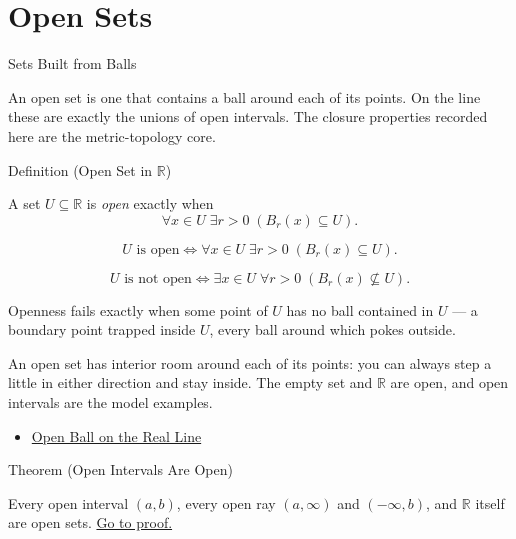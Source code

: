 \section{Open Sets}
\label{sec:open-sets}

\begin{topicbox}{Sets Built from Balls}
\begin{exposition}
An open set is one that contains a ball around each of its points. On the line these are exactly the unions of open intervals. The closure properties recorded here are the metric-topology core.
\end{exposition}
\end{topicbox}
\begin{definitionbox}{Definition (Open Set in $\mathbb{R}$)}
\begin{definition}
\label{def:open-set}
A set $U\subseteq\mathbb{R}$ is \emph{open} exactly when
\[
\forall x\in U\;\exists r>0\;(B_{r}(x)\subseteq U).
\]
\end{definition}
\end{definitionbox}
\begin{remark*}
\[
U \text{ is open} \Longleftrightarrow \forall x\in U\;\exists r>0\;(B_{r}(x)\subseteq U).
\]
\end{remark*}
\begin{remark*}
\[
U \text{ is not open} \Longleftrightarrow \exists x\in U\;\forall r>0\;(B_{r}(x)\not\subseteq U).
\]
\end{remark*}
\begin{remark*}
Openness fails exactly when some point of $U$ has no ball contained in $U$ --- a boundary point trapped inside $U$, every ball around which pokes outside.
\end{remark*}
\begin{remark*}[Interpretation]
An open set has interior room around each of its points: you can always step a little in either direction and stay inside. The empty set and $\mathbb{R}$ are open, and open intervals are the model examples.
\end{remark*}
\begin{dependencies}
\begin{itemize}
  \item \hyperref[def:open-ball]{Open Ball on the Real Line}
\end{itemize}
\end{dependencies}
\begin{theorembox}{Theorem (Open Intervals Are Open)}
\begin{theorem}
\label{thm:open-interval-is-open}
Every open interval $(a,b)$, every open ray $(a,\infty)$ and $(-\infty,b)$, and $\mathbb{R}$ itself are open sets.
\hyperref[prf:open-interval-is-open]{Go to proof.}
\end{theorem}
\end{theorembox}
